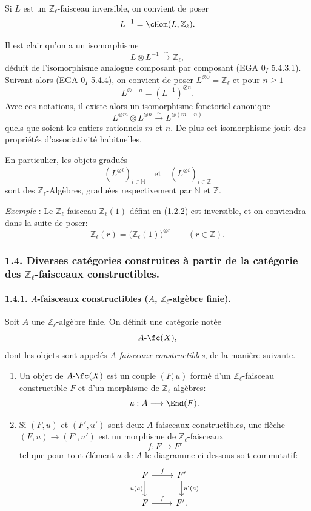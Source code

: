 Si \(L\) est un \(\mathbb{Z}_\ell\)-faisceau inversible, on convient de poser
\[
L^{-1}=\cHom(L,\mathbb{Z}_\ell).
\]

Il est clair qu'on a un isomorphisme
\[
L\otimes L^{-1}\xrightarrow{\sim}\mathbb{Z}_\ell,
\]
déduit de l'isomorphisme analogue composant par composant (EGA \(0_I\) 5.4.3.1). Suivant alors (EGA \(0_I\) 5.4.4), on convient de poser \(L^{\otimes0}=\mathbb{Z}_\ell\) et pour \(n\ge1\)
\[
L^{\otimes -n}=(L^{-1})^{\otimes n}.
\]
Avec ces notations, il existe alors un isomorphisme fonctoriel canonique
\[
L^{\otimes m}\otimes L^{\otimes n}\xrightarrow{\sim}L^{\otimes(m+n)}
\]
quels que soient les entiers rationnels \(m\) et \(n\). De plus cet isomorphisme
jouit 
des propriétés d'associativité habituelles.

En particulier, les objets gradués
\[
(L^{\otimes i})_{i\in\mathbb{N}}\quad\text{et}\quad(L^{\otimes i})_{i\in\mathbb{Z}}
\]
sont des \(\mathbb{Z}_\ell\)-Algèbres, graduées respectivement par \(\mathbb{N}\) et \(\mathbb{Z}\).

\emph{Exemple} : Le \(\mathbb{Z}_\ell\)-faisceau \(\mathbb{Z}_\ell(1)\) défini en (1.2.2) est inversible, et on conviendra dans la suite de poser:
\[
\mathbb{Z}_\ell(r)=\bigl(\mathbb{Z}_\ell(1)\bigr)^{\otimes r}\qquad (r\in\mathbb{Z}).
\]

\subsubsection*{1.4. Diverses catégories construites à partir de la catégorie des \(\mathbb{Z}_\ell\)-faisceaux constructibles.}

\paragraph{1.4.1. \(A\)-faisceaux constructibles (\(A\), \(\mathbb{Z}_\ell\)-algèbre finie).}
Soit \(A\) une \(\mathbb{Z}_\ell\)-algèbre finie. On définit une catégorie notée
\[
A\text{-}\fc(X),
\]
dont les objets sont appelés \(A\)-\emph{faisceaux constructibles}, de la manière suivante.

\begin{enumerate}[label=(\roman*)]
\item Un objet de \(A\text{-}\fc(X)\) est un couple \((F,u)\) formé d'un \(\mathbb{Z}_\ell\)-faisceau constructible \(F\) et d'un morphisme de \(\mathbb{Z}_\ell\)-algèbres:
\[
u:A\longrightarrow \End(F).
\]
\item Si \((F,u)\) et \((F',u')\) sont deux \(A\)-faisceaux constructibles, une flèche \((F,u)\to(F',u')\) est un morphisme de \(\mathbb{Z}_\ell\)-faisceaux
\[
f:F\longrightarrow F'
\]
tel que pour tout élément \(a\) de \(A\) le diagramme ci-dessous soit commutatif:
\[
\begin{tikzcd}
F \arrow[r,"f"] \arrow[d,"u(a)"'] & F' \arrow[d,"u'(a)"]\\
F \arrow[r,"f"] & F'.
\end{tikzcd}
\]
\end{enumerate}

